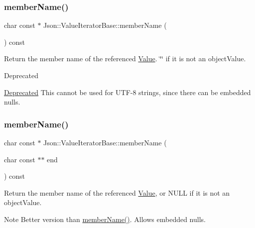 \subsubsection{\texorpdfstring{member\+Name()}{memberName()}\hspace{0.1cm}{\footnotesize\ttfamily [1/2]}}
{\footnotesize\ttfamily char const  $\ast$ Json\+::\+Value\+Iterator\+Base\+::member\+Name (\begin{DoxyParamCaption}{ }\end{DoxyParamCaption}) const}

Return the member name of the referenced \hyperlink{classJson_1_1Value}{Value}. \char`\"{}\char`\"{} if it is not an object\+Value. \begin{DoxyRefDesc}{Deprecated}
\item[\hyperlink{deprecated__deprecated000004}{Deprecated}]This cannot be used for U\+T\+F-\/8 strings, since there can be embedded nulls. \end{DoxyRefDesc}
\mbox{\label{classJson_1_1ValueIteratorBase_a391c9cbd0edf9a447b37df00e8ce6059}} 
\subsubsection{\texorpdfstring{member\+Name()}{memberName()}\hspace{0.1cm}{\footnotesize\ttfamily [2/2]}}
{\footnotesize\ttfamily char const  $\ast$ Json\+::\+Value\+Iterator\+Base\+::member\+Name (\begin{DoxyParamCaption}\item[{char const $\ast$$\ast$}]{end }\end{DoxyParamCaption}) const}

Return the member name of the referenced \hyperlink{classJson_1_1Value}{Value}, or N\+U\+LL if it is not an object\+Value. \begin{DoxyNote}{Note}
Better version than \hyperlink{classJson_1_1ValueIteratorBase_a54765da6759fd3f1edcbfbaf308ec263}{member\+Name()}. Allows embedded nulls. 
\end{DoxyNote}
\mbox{\label{classJson_1_1ValueIteratorBase_a522989403c976fdbb94da846b99418db}} 
